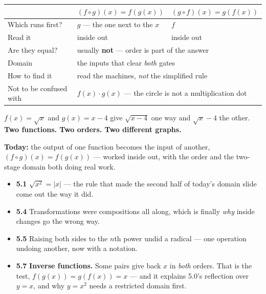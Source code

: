 \documentclass[aspectratio=169, 11pt]{beamer}
\begin{document}
\begin{frame}[t, plain]
  \begin{center}
  \footnotesize
  \renewcommand{\arraystretch}{1.35}
  \begin{tabular}{lll}
  \hline
   & \textbf{$(f\circ g)(x)=f(g(x))$} & \textbf{$(g\circ f)(x)=g(f(x))$} \\
  \hline
  Which runs first? & $g$ --- the one next to the $x$ & $f$ \\
  Read it & inside out & inside out \\
  Are they equal? & \multicolumn{2}{l}{usually \textbf{not} --- order is part of the answer} \\
  Domain & \multicolumn{2}{l}{the inputs that clear \emph{both} gates} \\
  How to find it & \multicolumn{2}{l}{read the machines, \emph{not} the simplified rule} \\
  Not to be confused with & \multicolumn{2}{l}{$f(x)\cdot g(x)$ --- the circle is not a
  multiplication dot} \\
  \hline
  \end{tabular}
  \end{center}
  \vspace{8pt}
  \begin{center}
    $f(x)=\sqrt{x}$ and $g(x)=x-4$ give $\sqrt{x-4}$ one way and $\sqrt{x}-4$ the other. \\[3pt]
    \textbf{Two functions. Two orders. Two different graphs.}
  \end{center}
\end{frame}

\begin{frame}[t, plain]
  \textbf{Today:} the output of one function becomes the input of another, $(f\circ g)(x)=f(g(x))$
  --- worked inside out, with the order and the two-stage domain both doing real work.\\[8pt]
  \begin{itemize}\setlength{\itemsep}{3pt}
    \item \textbf{5.1} $\sqrt{x^{2}}=|x|$ --- the rule that made the second half of today's domain
          slide come out the way it did.
    \item \textbf{5.4} Transformations were compositions all along, which is finally \emph{why}
          inside changes go the wrong way.
    \item \textbf{5.5} Raising both sides to the $n$th power undid a radical --- one operation
          undoing another, now with a notation.
    \item \textbf{5.7} \textbf{Inverse functions.} Some pairs give back $x$ in \emph{both} orders.
          That is the test, $f(g(x))=g(f(x))=x$ --- and it explains 5.0's reflection over $y=x$, and
          why $y=x^{2}$ needs a restricted domain first.
  \end{itemize}
\end{frame}
\end{document}
